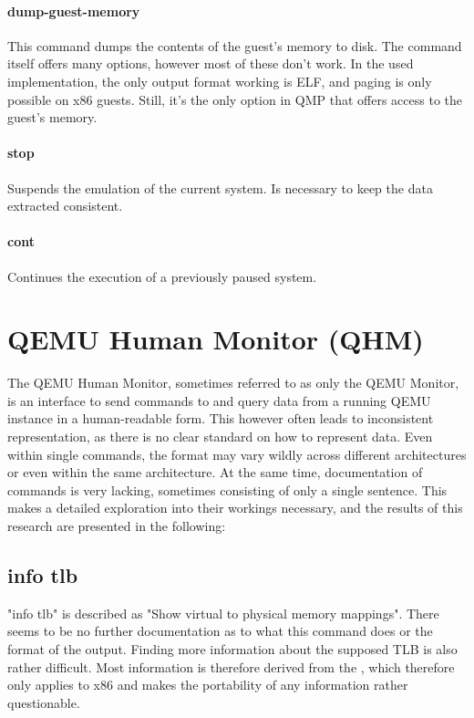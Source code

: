 \paragraph{dump-guest-memory}\label{dump_memory}
This command dumps the contents of the guest's memory to disk.
The command itself offers many options, however most of these don't work.
In the used implementation, the only output format working is ELF, and paging is only possible on x86 guests.
Still, it's the only option in QMP that offers access to the guest's memory.

\paragraph{stop}
Suspends the emulation of the current system. Is necessary to keep the data extracted consistent.

\paragraph{cont}
Continues the execution of a previously paused system.

\section{QEMU Human Monitor (QHM)} \label{sec:QHM}
The QEMU Human Monitor, sometimes referred to as only the QEMU Monitor,
is an interface to send commands to and query data from a running QEMU instance in a human-readable form.
This however often leads to inconsistent representation, as there is no clear standard on how to represent data.
Even within single commands, the format may vary wildly across different architectures or even within the same architecture.
At the same time, documentation of commands is very lacking, sometimes consisting of only a single sentence.
This makes a detailed exploration into their workings necessary, and the results of this research are presented in the following\cite{qhm-documentation}:

\subsection{info tlb}
"info tlb" is described as "Show virtual to physical memory mappings"\cite{qhm-documentation}.
There seems to be no further documentation as to what this command does or the format of the output.
Finding more information about the supposed TLB is also rather difficult.
Most information is therefore derived from the ,
which therefore only applies to x86 and makes the portability of any information rather questionable.


